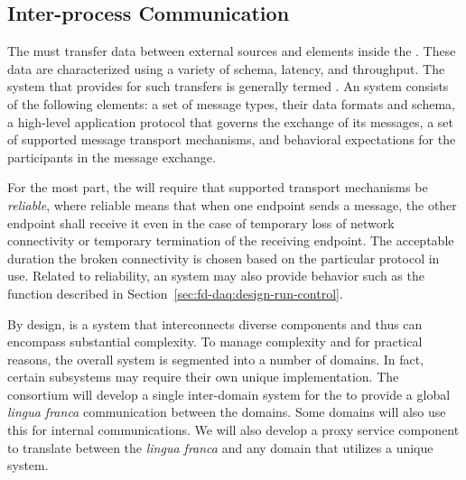   



\subsection{Inter-process Communication}
\label{sec:daq:design-ipc}

The  must transfer data between external sources and elements inside the . 
These data are characterized using a variety of schema, latency, and throughput. 
The system that provides for such transfers is generally termed .
An  system consists of the following elements:
a set of message types, their data formats and schema,
a high-level application protocol that governs the exchange of its messages,
a set of supported message transport mechanisms, and
behavioral expectations for the participants in the message exchange. 


For the most part, the   will require that supported transport mechanisms be \textit{reliable}, where 
reliable means that when one endpoint sends a message,
the other endpoint shall receive it even in the case of temporary loss of network connectivity or %
temporary termination of the receiving endpoint.
The acceptable duration the broken connectivity is chosen based on the particular protocol in use.
Related to reliability, an   system may also provide behavior such as the  function described in Section~\ref{sec:fd-daq:design-run-control}.

By design,  is a system that interconnects diverse components and thus can encompass substantial complexity. 
To manage complexity and for practical reasons, the overall  system is segmented into a number of  domains. 
In fact, 
certain  subsystems may require their own unique  implementation.
The  consortium will develop a single inter-domain  system %
for the   
to provide a global \textit{lingua franca} communication between the domains. 
Some domains will also use this  for internal communications. 
We will also develop a proxy service component %
 to translate between the \textit{lingua franca}  and any domain that utilizes a unique  system.

